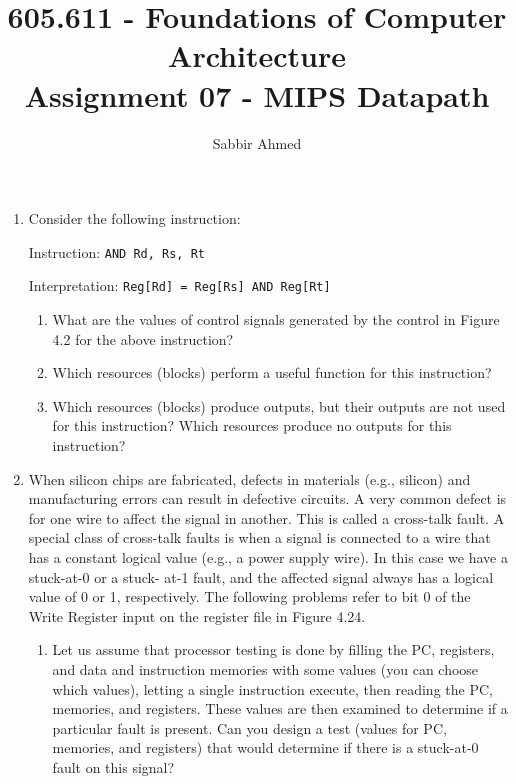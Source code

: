 \documentclass[12pt]{article}
\begin{document}
  \title{605.611 - Foundations of Computer Architecture \\ Assignment 07 - MIPS Datapath\vspace{-0.5em}}
  \author{Sabbir Ahmed}
  \maketitle
  \vspace{-1em}

  \begin{enumerate}

    \item Consider the following instruction:

    Instruction: \texttt{AND Rd, Rs, Rt}

    Interpretation: \texttt{Reg[Rd] = Reg[Rs] AND Reg[Rt]}

    \begin{enumerate}
        \item What are the values of control signals generated by the control in Figure 4.2 for the above instruction?

        \item Which resources (blocks) perform a useful function for this instruction?

        \item Which resources (blocks) produce outputs, but their outputs are not used for this instruction? Which resources produce no outputs for this instruction?

    \end{enumerate}

    \item When silicon chips are fabricated, defects in materials (e.g., silicon) and manufacturing errors can result in defective circuits. A very common defect is for one wire to affect the signal in another. This is called a cross-talk fault. A special class of cross-talk faults is when a signal is connected to a wire that has a constant logical value (e.g., a power supply wire). In this case we have a stuck-at-0 or a stuck- at-1 fault, and the affected signal always has a logical value of 0 or 1, respectively. The following problems refer to bit 0 of the Write Register input on the register file in Figure 4.24.

    \begin{enumerate}

        \item Let us assume that processor testing is done by filling the PC, registers, and data and instruction memories with some values (you can choose which values), letting a single instruction execute, then reading the PC, memories, and registers. These values are then examined to determine if a particular fault is present. Can you design a test (values for PC, memories, and registers) that would determine if there is a stuck-at-0 fault on this signal?


\end{enumerate}
\end{enumerate}
\end{document}
